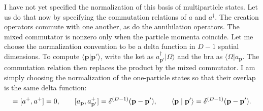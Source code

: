 I have not yet specified the normalization of this basis of multiparticle
states. Let us do that now by specifying the commutation relations of $a$ and
$a^\dagger$.
The creation operators commute with one another, as do the annihilation
operators.
The mixed commutator is nonzero only when the particle momenta coincide. Let me
choose the normalization convention to be a delta function in $D-1$ spatial
dimensions.
To compute $\langle\mathbf p|\mathbf p'\rangle$, write the ket as
$a^\dagger_{\mathbf p'}|\Omega\rangle$ and the bra as
$\langle\Omega|a_{\mathbf p}$.
The commutation relation then replaces the product by the mixed commutator.
I am simply choosing the normalization of the one-particle states so that their
overlap is the same delta function:
\begin{equation}
  [a,a]=[a^{+},a^{+}]=0,
  \qquad
  [a_{\mathbf p},a_{\mathbf p'}^{+}]
  =\delta^{(D-1)}(\mathbf p-\mathbf p'),
  \qquad
  \braket{\mathbf p}{\mathbf p'}
  =\delta^{(D-1)}(\mathbf p-\mathbf p').
  \label{eq:253a-oscillator-normalization}
\end{equation}

